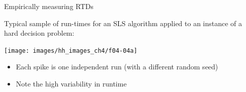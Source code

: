 \begin{frame}[c]{Empirically measuring RTDs}

Typical sample of run-times for an SLS algorithm applied to an instance of a hard decision problem:

\begin{center}
\hspace*{-7mm}
\texttt{[image: images/hh\_images\_ch4/f04-04a]}
\end{center}
\vspace*{-6mm}

\begin{itemize}
  \item Each spike is one independent run (with a different random seed)
  \item Note the high variability in runtime
\end{itemize}


\end{frame}

